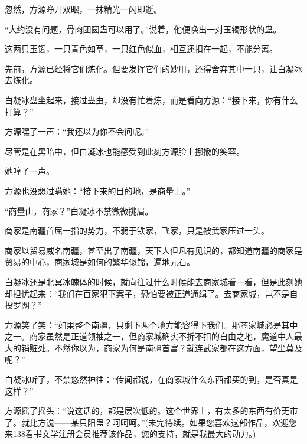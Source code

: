 \begin{this_body}
忽然，方源睁开双眼，一抹精光一闪即逝。

“大约没有问题，骨肉团圆蛊可以用了。”说着，他便唤出一对玉镯形状的蛊。

这两只玉镯，一只青色如草，一只红色似血，相互还扣在一起，不能分离。

先前，方源已经将它们炼化。但要发挥它们的妙用，还得舍弃其中一只，让白凝冰去炼化。

白凝冰盘坐起来，接过蛊虫，却没有忙着炼，而是看向方源：“接下来，你有什么打算？”

方源嘿了一声：“我还以为你不会问呢。”

尽管是在黑暗中，但白凝冰也能感受到此刻方源脸上挪揄的笑容。

她哼了一声。

方源也没想过瞒她：“接下来的目的地，是商量山。”

“商量山，商家？”白凝冰不禁微微挑眉。

商家是南疆首屈一指的势力，不弱于铁家，飞家，只是被武家压过一头。

商家以贸易威名南疆，甚至出了南疆，天下人但凡有见识的，都知道南疆的商家是贸易的中心，商家城是如何的繁华似锦，遍地元石。

白凝冰还是北冥冰魄体的时候，就向往过什么时候能去商家城看一看，但是此刻她却担忧起来：“我们在百家犯下案子，恐怕要被正道通缉了。去商家城，岂不是自投罗网？”

方源笑了笑：“如果整个南疆，只剩下两个地方能容得下我们。那商家城必是其中之一。商家虽然是正道领袖之一，但商家城确实不折不扣的自由之地，魔道中人最大的销赃处。不然你以为，商家为何是南疆首富？就连武家都在这方面，望尘莫及呢？”

白凝冰听了，不禁悠然神往：“传闻都说，在商家城什么东西都买的到，是否真是这样？”

方源摇了摇头：“说这话的，都是层次低的。这个世界上，有太多的东西有价无市了。就比方说——某只阳蛊？呵呵呵。”(未完待续。如果您喜欢这部作品，欢迎您来138看书文学注册会员推荐该作品，您的支持，就是我最大的动力。)

\end{this_body}

